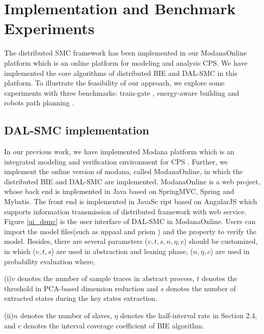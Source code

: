 \section{Implementation and Benchmark Experiments}
The distributed SMC framework has been implemented in our ModanaOnline platform which is an online platform for modeling and analysis CPS. We have implemented the core algorithms of distributed BIE and DAL-SMC in this platform. To illustrate the feasibility of our approach, we explore some experiments with three benchmarks: train-gate \cite{David2015Uppaal}, energy-aware building \cite{david2012evaluation} and robots path planning \cite{Miura2000Modeling}.

\subsection{DAL-SMC implementation}
In our previous work, we have implemented Modana platform which is an integrated modeling and verification environment for CPS \cite{Cheng2015Modana}. Further, we implement the online version of modana, called ModanaOnline, in which the distributed BIE and DAL-SMC are implemented. ModanaOnline is a web project, whose back end is implemented in Java based on SpringMVC, Spring and Mybatis. The front end is implemented in JavaSc
ript based on AngularJS which supports information transmission of distributed framework with web service. Figure \ref{ui_dsmc} is the user interface of DAL-SMC in ModanaOnline. Users can import the model files(such as uppaal \cite{Behrmann2006UPPAAL} and prism \cite{Kwiatkowska2002PRISM}) and the property to verify the model. Besides, there are several parameters ($v,t,s,n,\eta,c$) should be customized, in which ($v,t,s$) are used in abstraction and leaning phase, ($n,\eta,c$) are used in probability evaluation where,

(i)$v$ denotes the number of sample traces in abstract process, $t$ denotes the threshold in PCA-based dimension reduction and $s$ denotes the number of extracted states during the key states extraction.

(ii)$n$ denotes the number of slaves, $\eta$ denotes the half-interval rate in Section 2.4, and $c$ denotes the interval coverage coefficient of BIE algorithm.

